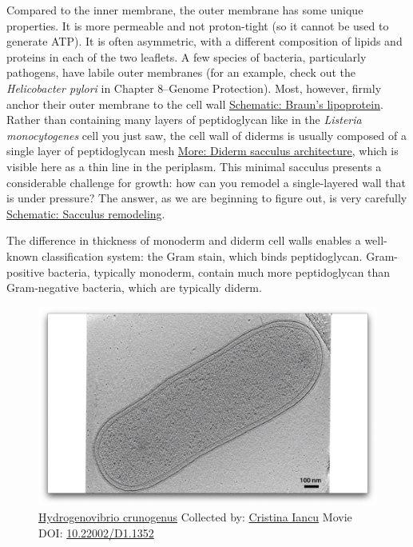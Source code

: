 \documentclass[]{tufte-book}
\begin{document}
Compared to the inner membrane, the outer membrane has some unique
properties. It is more permeable and not proton-tight (so it cannot be
used to generate ATP). It is often asymmetric, with a different
composition of lipids and proteins in each of the two leaflets. A few
species of bacteria, particularly pathogens, have labile outer membranes
(for an example, check out the \emph{Helicobacter pylori} in Chapter
8--Genome Protection). Most, however, firmly anchor their outer membrane
to the cell wall \protect\hyperlink{Brauns_lipoprotein}{Schematic:
Braun's lipoprotein}. Rather than containing many layers of
peptidoglycan like in the \emph{Listeria monocytogenes} cell you just
saw, the cell wall of diderms is usually composed of a single layer of
peptidoglycan mesh
\protect\hyperlink{Diderm_sacculus_architecture}{More: Diderm sacculus
architecture}, which is visible here as a thin line in the periplasm.
This minimal sacculus presents a considerable challenge for growth: how
can you remodel a single-layered wall that is under pressure? The
answer, as we are beginning to figure out, is very carefully
\protect\hyperlink{Sacculus_remodeling}{Schematic: Sacculus remodeling}.

The difference in thickness of monoderm and diderm cell walls enables a
well-known classification system: the Gram stain, which binds
peptidoglycan. Gram-positive bacteria, typically monoderm, contain much
more peptidoglycan than Gram-negative bacteria, which are typically
diderm.





\begin{figure}
\includegraphics{movie_stills/2_3} \caption[\protect\hyperlink{tree}{Hydrogenovibrio crunogenus} Collected
by: \protect\hyperlink{cristina_iancu}{Cristina Iancu} Movie DOI:
\href{https://doi.org/10.22002/D1.1352}{10.22002/D1.1352}]{\protect\hyperlink{tree}{Hydrogenovibrio crunogenus} Collected
by: \protect\hyperlink{cristina_iancu}{Cristina Iancu} Movie DOI:
\href{https://doi.org/10.22002/D1.1352}{10.22002/D1.1352}}\label{fig:2-3}
\end{figure}
\end{document}
